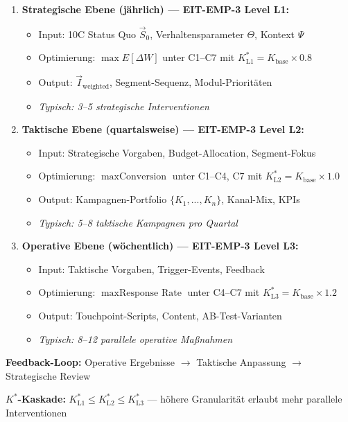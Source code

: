 \begin{tcolorbox}[colback=green!5!white, colframe=green!75!black,
    title=\textbf{Der hierarchische Optimierungs-Workflow}]

\begin{enumerate}
\item \textbf{Strategische Ebene (jährlich) --- EIT-EMP-3 Level L1:}
\begin{itemize}[nosep]
\item Input: 10C Status Quo $\vec{S}_0$, Verhaltensparameter $\Theta$, Kontext $\Psi$
\item Optimierung: $\max E[\Delta W]$ unter C1--C7 mit $K^*_{\text{L1}} = K_{\text{base}} \times 0.8$
\item Output: $\vec{I}_{\text{weighted}}$, Segment-Sequenz, Modul-Prioritäten
\item \textit{Typisch: 3--5 strategische Interventionen}
\end{itemize}

\item \textbf{Taktische Ebene (quartalsweise) --- EIT-EMP-3 Level L2:}
\begin{itemize}[nosep]
\item Input: Strategische Vorgaben, Budget-Allocation, Segment-Fokus
\item Optimierung: $\max \text{Conversion}$ unter C1--C4, C7 mit $K^*_{\text{L2}} = K_{\text{base}} \times 1.0$
\item Output: Kampagnen-Portfolio $\{K_1, ..., K_n\}$, Kanal-Mix, KPIs
\item \textit{Typisch: 5--8 taktische Kampagnen pro Quartal}
\end{itemize}

\item \textbf{Operative Ebene (wöchentlich) --- EIT-EMP-3 Level L3:}
\begin{itemize}[nosep]
\item Input: Taktische Vorgaben, Trigger-Events, Feedback
\item Optimierung: $\max \text{Response Rate}$ unter C4--C7 mit $K^*_{\text{L3}} = K_{\text{base}} \times 1.2$
\item Output: Touchpoint-Scripts, Content, AB-Test-Varianten
\item \textit{Typisch: 8--12 parallele operative Maßnahmen}
\end{itemize}
\end{enumerate}

\textbf{Feedback-Loop:} Operative Ergebnisse $\rightarrow$ Taktische Anpassung $\rightarrow$ Strategische Review

\textbf{$K^*$-Kaskade:} $K^*_{\text{L1}} \leq K^*_{\text{L2}} \leq K^*_{\text{L3}}$ --- höhere Granularität erlaubt mehr parallele Interventionen

\end{tcolorbox}

